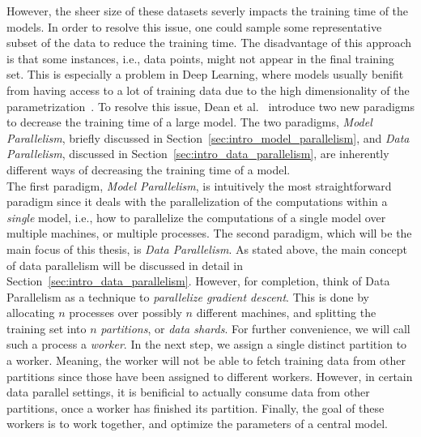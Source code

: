 However, the sheer size of these datasets severly impacts the training time of the models. In order to resolve this issue, one could sample some representative subset of the data to reduce the training time. The disadvantage of this approach is that some instances, i.e., data points, might not appear in the final training set. This is especially a problem in Deep Learning, where models usually benifit from having access to a lot of training data due to the high dimensionality of the parametrization~\cite{dean2012large}. To resolve this issue, Dean et al.~\cite{dean2012large} introduce two new paradigms to decrease the training time of a large model. The two paradigms, \emph{Model Parallelism}, briefly discussed in Section~\ref{sec:intro_model_parallelism}, and \emph{Data Parallelism}, discussed in Section~\ref{sec:intro_data_parallelism}, are inherently different ways of decreasing the training time of a model.\\

The first paradigm, \emph{Model Parallelism}, is intuitively the most straightforward paradigm since it deals with the parallelization of the computations within a \emph{single} model, i.e., how to parallelize the computations of a single model over multiple machines, or multiple processes. The second paradigm, which will be the main focus of this thesis, is \emph{Data Parallelism}. As stated above, the main concept of data parallelism will be discussed in detail in Section~\ref{sec:intro_data_parallelism}. However, for completion, think of Data Parallelism as a technique to \emph{parallelize gradient descent}. This is done by allocating $n$ processes over possibly $n$ different machines, and splitting the training set into $n$ \emph{partitions}, or \emph{data shards}. For further convenience, we will call such a process a \emph{worker}. In the next step, we assign a single distinct partition to a worker. Meaning, the worker will not be able to fetch training data from other partitions since those have been assigned to different workers. However, in certain data parallel settings, it is benificial to actually consume data from other partitions, once a worker has finished its partition. Finally, the goal of these workers is to work together, and optimize the parameters of a central model.\\

